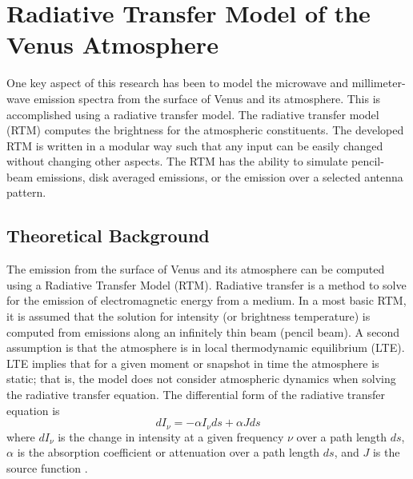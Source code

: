 \chapter[Radiative Transfer Model of the \\Venus Atmosphere]{Radiative Transfer Model of the Venus Atmosphere}


One key aspect of this research has been to model the microwave and millimeter-wave emission spectra from the surface of Venus and its atmosphere. This is accomplished using a radiative transfer model. The radiative transfer model (RTM) computes the brightness for the atmospheric constituents. The developed RTM is written in a modular way such that any input can be easily changed without changing other aspects. The RTM has the ability to simulate pencil-beam emissions, disk averaged emissions, or the emission over a selected antenna pattern. %

\section{Theoretical Background}

The emission from the surface of Venus and its atmosphere can be computed using a Radiative Transfer Model (RTM). Radiative transfer is a method to solve for the emission of electromagnetic energy from a medium. In a most basic RTM, it is assumed that the solution for intensity (or brightness temperature) is computed from emissions along an infinitely thin beam (pencil beam). A second assumption is that the atmosphere is in local thermodynamic equilibrium (LTE). LTE implies that for a given moment or snapshot in time the atmosphere is static; that is, the model does not consider atmospheric dynamics when solving the radiative transfer equation. The differential form of the radiative transfer equation is
\begin{equation}\label{eq:rtm-diff}
dI_{\nu}= -\alpha I_{\nu }ds + \alpha J ds
\end{equation}
where $dI_\nu$ is the change in intensity at a given frequency $\nu$ over a path length $ds$, $\alpha$ is the absorption coefficient or attenuation over a path length $ds$, and $J$ is the source function \cite{Liou-2002}. 

